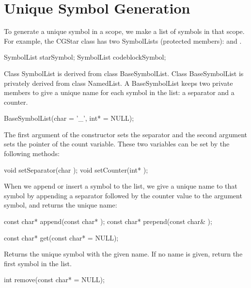 \section{Unique Symbol Generation}

To generate a unique symbol in a scope, we make a list of symbols in that
scope. For example, the CGStar class has two SymbolLists (protected
members):  and . 

\begin{example}
SymbolList starSymbol;
SymbolList codeblockSymbol;
\end{example}

Class SymbolList is derived from class BaseSymbolList. Class BaseSymbolList
is privately derived from class NamedList.
A BaseSymbolList keeps two private  members to give a unique name for 
each symbol in the list: a separator and a counter.

\begin{example}
BaseSymbolList(char  = '_', int*  = NULL);
\end{example}

The first argument of the constructor sets the separator and the second 
argument sets the pointer of the count variable. These two variables can be
set by the following methods:

\begin{example}
void setSeparator(char );
void setCounter(int* );
\end{example}

When we append or insert a symbol to the list, we give a unique 
name to that symbol by appending a separator followed by the counter value
to the argument symbol, and returns the unique name:

\begin{example}
const char* append(const char* );
const char* prepend(const char& );
\end{example}

\begin{example}
const char* get(const char*  = NULL);
\end{example}

Returns the unique symbol with the given name. If no name is given, return the
first symbol in the list.

\begin{example}
int remove(const char*  = NULL);
\end{example}

